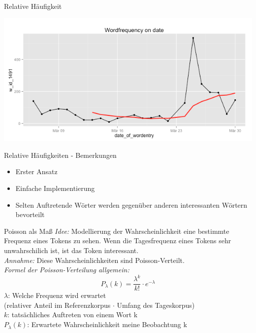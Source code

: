\documentclass{beamer}
\begin{document}
\begin{frame}{Relative Häufigkeit}
	\hspace{2cm}
	  \begin{centering}
	  \includegraphics[width=1\textwidth]{pictures/freqratioFlugzeug.png}
	\end{centering}
\end{frame}

\begin{frame}{Relative H\"aufigkeiten - Bemerkungen}
\begin{itemize}
 	\item Erster Ansatz
 	\item Einfache Implementierung
 	\item Selten Auftretende W\"orter werden gegen\"uber anderen interessanten W\"ortern bevorteilt
 \end{itemize}
\end{frame}


\begin{frame}{Poisson als Ma\ss}
	\emph{Idee: } Modellierung der Wahrscheinlichkeit eine bestimmte Frequenz eines Tokens zu sehen. Wenn die Tagesfrequenz eines Tokens sehr unwahrschilich ist, ist das Token interessant.\\
	\emph{Annahme: } Diese Wahrscheinlichkeiten sind Poisson-Verteilt.\\
	\emph{Formel der Poisson-Verteilung allgemein: }
	\begin{equation}
	P_\lambda(k) = \frac{\lambda^{k}}{k!}  \cdot e^{-\lambda}
	\end{equation}
	$\lambda$: Welche Frequenz wird erwartet \\
	(relativer Anteil im Referenzkorpus $\cdot$ Umfang des Tageskorpus)\\
	$k$: tats\"achliches Auftreten von einem Wort k\\
	$P_\lambda(k)$: Erwartete Wahrscheinlichkeit meine Beobachtung k
\end{frame}
\end{document}
